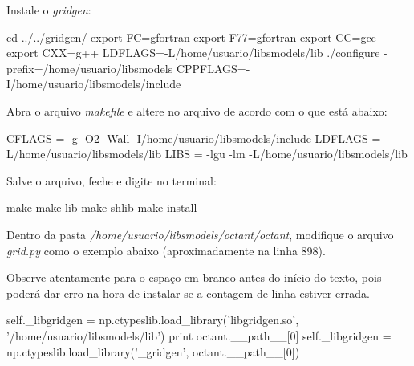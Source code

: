 \noindent Instale o \textit{gridgen}:
\bigskip
\begin{bashcode}[fontsize=\scriptsize]
cd ../../gridgen/
export FC=gfortran
export F77=gfortran
export CC=gcc
export CXX=g++
LDFLAGS=-L/home/usuario/libsmodels/lib
./configure -prefix=/home/usuario/libsmodels CPPFLAGS=-I/home/usuario/libsmodels/include
\end{bashcode}
\bigskip

\noindent Abra o arquivo \textit{makefile} e altere no arquivo de acordo com o que está abaixo:
\bigskip

\begin{bashcode}
CFLAGS = -g -O2 -Wall -I/home/usuario/libsmodels/include
LDFLAGS = -L/home/usuario/libsmodels/lib
LIBS = -lgu -lm -L/home/usuario/libsmodels/lib
\end{bashcode}
\bigskip

\noindent Salve o arquivo, feche e digite no terminal:
\bigskip

\begin{bashcode}
make
make lib
make shlib
make install
\end{bashcode}
\bigskip

\noindent Dentro da pasta \textit{/home/usuario/libsmodels/octant/octant}, modifique o arquivo \textit{grid.py} como o exemplo abaixo (aproximadamente na linha 898).
\bigskip

\begin{tcolorbox}[enhanced,
  grow to left by=0cm,%
  grow to right by=0cm,%
  enlarge top by=0cm,%
  enlarge bottom by=0cm,%
  tcbox raise base,
  boxrule=1.0pt,
  left=18mm,
  colframe=red!50!black,coltext=red!25!black,colback=red!10!white,
  overlay={\begin{tcbclipinterior}\fill[red!75!blue!50!white] (frame.south west)
    rectangle node[text=white,font=\sffamily\bfseries\footnotesize,rotate=0] {ATENÇÃO} ([xshift=18mm]frame.north west);\end{tcbclipinterior}}]
Observe atentamente para o espaço em branco antes do início do texto, pois poderá dar erro na hora de instalar se a contagem de linha estiver errada.
\end{tcolorbox}
\bigskip


\begin{bashcode}[fontsize=\footnotesize]
self._libgridgen = np.ctypeslib.load_library('libgridgen.so', '/home/usuario/libsmodels/lib')
print octant.__path__[0]
self._libgridgen = np.ctypeslib.load_library('_gridgen', octant.__path__[0])
\end{bashcode}
\bigskip

